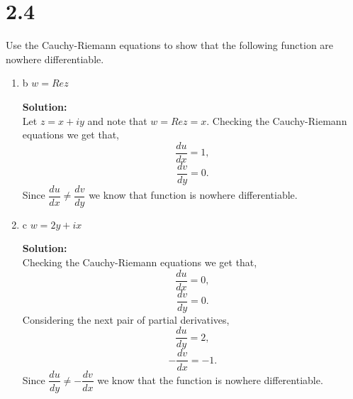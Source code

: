 \documentclass[12pt]{article}
\makeatletter
\theoremstyle{homework}
\newenvironment{exercise}[1]
{\def\@currentlabel{#1}\exercisecore}
{\endexercisecore}
\newcommand{\localhead}[1]{\par\smallskip\noindent\textbf{#1}\nobreak\\}%
\newcommand\solution{\localhead{Solution:}}
\makeatother
\begin{document}
  \section*{2.4}

  \begin{exercise}{1} Use the Cauchy-Riemann equations to show that the following function are nowhere differentiable.
    \begin{enumerate}
      \item{b} $w = Re z$\\
      \solution Let $z = x + iy$ and note that $w = Re z = x$. Checking the Cauchy-Riemann equations we get that, 
      \begin{equation*}
        \dfrac{du}{dx} = 1,
      \end{equation*}
      \begin{equation*}
        \dfrac{dv}{dy} = 0.
      \end{equation*}
      Since $\dfrac{du}{dx} \neq \dfrac{dv}{dy}$ we know that function is nowhere differentiable. 
      \vspace{.15in}

      \item{c} $w = 2y + ix$\\
      \solution Checking the Cauchy-Riemann equations we get that, 
      \begin{equation*}
        \dfrac{du}{dx} = 0,
      \end{equation*}
      \begin{equation*}
        \dfrac{dv}{dy} = 0.
      \end{equation*}
      Considering the next pair of partial derivatives, 
      \begin{equation*}
        \dfrac{du}{dy} = 2,
      \end{equation*}
      \begin{equation*}
        -\dfrac{dv}{dx} = -1.
      \end{equation*}
      Since $\dfrac{du}{dy} \neq -\dfrac{dv}{dx}$ we know that the function is nowhere differentiable. 
    \end{enumerate}
  \end{exercise}
  \vspace{.5in}
\end{document}
